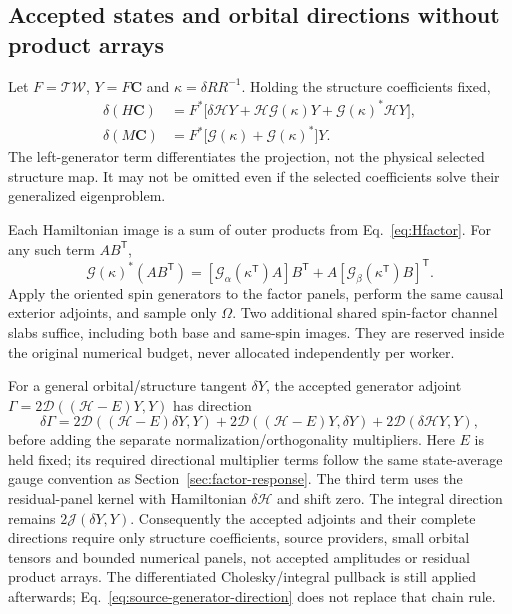\documentclass[11pt,a4paper]{article}
\newcommand{\Tr}{^{\mathsf T}}
\newcommand{\Wa}{\mathcal W}
\newcommand{\Ta}{\mathcal T}
\newcommand{\Ha}{\mathcal H}
\renewcommand{\vv}[1]{\mathbf{#1}}
\begin{document}
\subsection{Accepted states and orbital directions without product arrays}\label{sec:source-state}

Let $F=\Ta\Wa$, $Y=F\vv C$ and
$\kappa=\delta R R^{-1}$. Holding the structure coefficients fixed,
\begin{align}\label{eq:source-direction-images}
 \delta(H\vv C)&=F^*\bigl[\delta\Ha Y+
               \Ha\mathcal G(\kappa)Y+
               \mathcal G(\kappa)^*\Ha Y\bigr],\\
 \delta(M\vv C)&=F^*\bigl[\mathcal G(\kappa)+
                               \mathcal G(\kappa)^*\bigr]Y.
\end{align}
The left-generator term differentiates the projection, not the physical
selected structure map. It may not be omitted even if the selected
coefficients solve their generalized eigenproblem.

Each Hamiltonian image is a sum of outer products from Eq.~\eqref{eq:Hfactor}.
For any such term $AB\Tr$,
\begin{equation}
 \mathcal G(\kappa)^*(AB\Tr)=
   [\mathcal G_\alpha(\kappa\Tr)A]B\Tr
   +A[\mathcal G_\beta(\kappa\Tr)B]\Tr.
\end{equation}
Apply the oriented spin generators to the factor panels, perform the same
causal exterior adjoints, and sample only $\Omega$. Two additional shared
spin-factor channel slabs suffice, including both base and same-spin
images. They are reserved inside the original numerical budget, never
allocated independently per worker.

For a general orbital/structure tangent $\delta Y$, the accepted generator
adjoint $\Gamma=2\mathcal D((\Ha-E)Y,Y)$ has direction
\begin{equation}\label{eq:source-generator-direction}
 \delta\Gamma=2\mathcal D((\Ha-E)\delta Y,Y)
             +2\mathcal D((\Ha-E)Y,\delta Y)
             +2\mathcal D(\delta\Ha Y,Y),
\end{equation}
before adding the separate normalization/orthogonality multipliers.
Here $E$ is held fixed; its required directional multiplier terms follow
the same state-average gauge convention as Section~\ref{sec:factor-response}.
The third term uses the residual-panel kernel with Hamiltonian $\delta\Ha$
and shift zero. The integral direction remains $2\mathcal J(\delta Y,Y)$.
Consequently the accepted adjoints and their complete directions require
only structure coefficients, source providers, small orbital tensors and
bounded numerical panels, not accepted amplitudes or residual product arrays.
The differentiated Cholesky/integral pullback is still applied afterwards;
Eq.~\eqref{eq:source-generator-direction} does not replace that chain rule.
\end{document}
